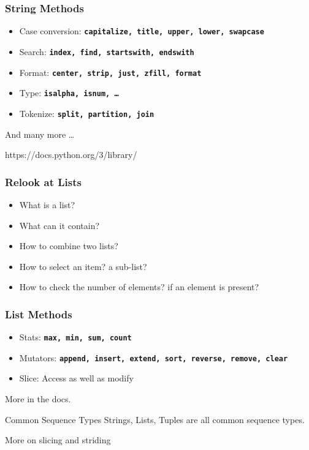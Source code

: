 \documentclass[14pt]{beamer}
\begin{document}
\begin{frame}
  \frametitle{String Methods}
  \begin{itemize}
  \item Case conversion: \textbf{\texttt{capitalize, title, upper, lower, swapcase}}
    \pause
  \item Search: \textbf{\texttt{index, find, startswith, endswith}}
    \pause
  \item Format: \textbf{\texttt{center, strip, just, zfill, format}} 
    \pause
  \item Type: \textbf{\texttt{isalpha, isnum, \ldots}}
    \pause
  \item Tokenize: \textbf{\texttt{split, partition, join}}
  \end{itemize}
  And many more \ldots 
  
  https://docs.python.org/3/library/
\end{frame}

\begin{frame}
  \frametitle{Relook at Lists}
  \begin{itemize}
  \item What is a list?
    \pause
  \item What can it contain?
    \pause
  \item How to combine two lists?
    \pause
  \item How to select an item? a sub-list?
    \pause
  \item How to check the number of elements? if an element is present? 
  \end{itemize}
\end{frame}

\begin{frame}
  \frametitle{List Methods}
  \begin{itemize}
  \item Stats: \textbf{\texttt{max, min, sum, count}}
    \pause
  \item Mutators: \textbf{\texttt{append, insert, extend, sort, reverse, remove, clear}}
    \pause
  \item Slice: Access as well as modify
  \end{itemize}
  More in the docs.
\end{frame}

\begin{frame}{Common Sequence Types}
  Strings, Lists, Tuples are all common sequence types.

 More on slicing and striding
\end{frame}
\end{document}
